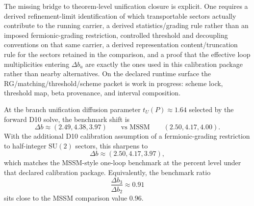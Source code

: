 The missing bridge to theorem-level unification closure is explicit. One requires a derived
refinement-limit identification of which transportable sectors actually contribute to the running
carrier, a derived statistics/grading rule rather than an imposed fermionic-grading restriction,
controlled threshold and decoupling conventions on that same carrier, a derived representation
content/truncation rule for the sectors retained in the comparison, and a proof that the effective
loop multiplicities entering \(\Delta b_a\) are exactly the ones used in this calibration package
rather than nearby alternatives. On the declared runtime surface the
RG/matching/threshold/scheme packet is work in progress: scheme lock, threshold map, beta
provenance, and interval composition.

At the branch unification diffusion parameter \(t_U(P)\approx 1.64\) selected by the forward D10
solve, the benchmark shift is
\[
\Delta b\approx (2.49,4.38,3.97)
\qquad
\text{vs MSSM}
\qquad
(2.50,4.17,4.00).
\]
With the additional D10 calibration assumption of a fermionic-grading restriction to
half-integer \(\mathrm{SU}(2)\) sectors, this sharpens to
\[
\Delta b\approx (2.50,4.17,3.97),
\]
which matches the MSSM-style one-loop benchmark at the percent level under that declared
calibration package. Equivalently, the benchmark ratio
\[
\frac{\Delta b_3}{\Delta b_2}\approx 0.91
\]
sits close to the MSSM comparison value \(0.96\).
